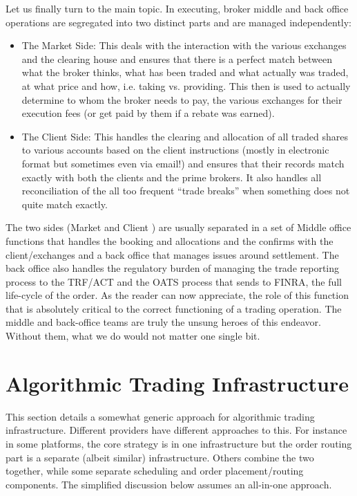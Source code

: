 Let us finally turn to the main topic. In executing, broker middle and back office operations are segregated into two distinct parts and are managed independently: 
        \begin{itemize}
        \item The Market Side: This deals with the interaction with the various exchanges  and the clearing house and ensures that there is a perfect match between what the broker thinks, what has been traded and what actually was traded, at what price and how, i.e. taking vs. providing. This then is used to actually determine to whom the broker needs to pay, the various exchanges for their execution fees (or get paid by them if a rebate was earned).
        \item The Client Side: This handles the clearing and allocation of all traded shares to various accounts based on the client instructions (mostly in electronic format but sometimes even via email!) and ensures that their records match exactly with both the clients and the prime brokers. It also handles all reconciliation of the all too frequent ``trade breaks'' when something does not quite match exactly.
        \end{itemize}


The two sides (Market and Client ) are usually separated in a set of Middle office functions that handles the booking and allocations and the confirms with the client/exchanges and a back office that manages issues around settlement. The back office also handles the regulatory burden of  managing the trade reporting process to the TRF/ACT and the OATS process that sends to FINRA, the full life-cycle of the order. As the reader can now appreciate, the role of this function that is absolutely critical to the correct functioning of a trading operation. The middle and back-office teams are truly the unsung heroes of this endeavor. Without them, what we do would not matter one single bit.



\section{Algorithmic Trading Infrastructure\label{sec:alg_trad_infra}}\label{in:trad_infr3}

This section details a somewhat generic approach for algorithmic trading infrastructure. Different providers have different approaches to this. For instance in some platforms, the core strategy is in one infrastructure but the order routing part is a separate (albeit similar) infrastructure. Others combine the two together, while some separate scheduling and order placement/routing components. The simplified discussion below assumes an all-in-one approach.


